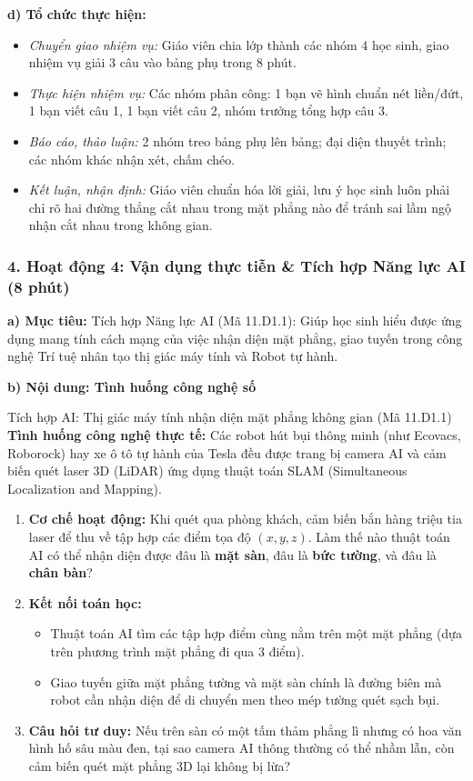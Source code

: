 \documentclass[12pt, a4paper]{article}
\begin{document}
\noindent \textbf{d) Tổ chức thực hiện:}
\begin{itemize}[leftmargin=0.8cm]
    \item \textit{Chuyển giao nhiệm vụ:} Giáo viên chia lớp thành các nhóm 4 học sinh, giao nhiệm vụ giải 3 câu vào bảng phụ trong 8 phút.
    \item \textit{Thực hiện nhiệm vụ:} Các nhóm phân công: 1 bạn vẽ hình chuẩn nét liền/đứt, 1 bạn viết câu 1, 1 bạn viết câu 2, nhóm trưởng tổng hợp câu 3.
    \item \textit{Báo cáo, thảo luận:} 2 nhóm treo bảng phụ lên bảng; đại diện thuyết trình; các nhóm khác nhận xét, chấm chéo.
    \item \textit{Kết luận, nhận định:} Giáo viên chuẩn hóa lời giải, lưu ý học sinh luôn phải chỉ rõ hai đường thẳng cắt nhau trong mặt phẳng nào để tránh sai lầm ngộ nhận cắt nhau trong không gian.
\end{itemize}

\subsubsection*{4. Hoạt động 4: Vận dụng thực tiễn \& Tích hợp Năng lực AI (8 phút)}

\noindent \textbf{a) Mục tiêu:}
Tích hợp Năng lực AI (Mã 11.D1.1): Giúp học sinh hiểu được ứng dụng mang tính cách mạng của việc nhận diện mặt phẳng, giao tuyến trong công nghệ Trí tuệ nhân tạo thị giác máy tính và Robot tự hành.

\noindent \textbf{b) Nội dung: Tình huống công nghệ số}
\begin{aibox}{Tích hợp AI: Thị giác máy tính nhận diện mặt phẳng không gian (Mã 11.D1.1)}
\textbf{Tình huống công nghệ thực tế:}
Các robot hút bụi thông minh (như Ecovacs, Roborock) hay xe ô tô tự hành của Tesla đều được trang bị camera AI và cảm biến quét laser 3D (LiDAR) ứng dụng thuật toán SLAM (Simultaneous Localization and Mapping).
\begin{enumerate}[leftmargin=0.6cm]
    \item \textbf{Cơ chế hoạt động:} Khi quét qua phòng khách, cảm biến bắn hàng triệu tia laser để thu về tập hợp các điểm tọa độ $(x, y, z)$. Làm thế nào thuật toán AI có thể nhận diện được đâu là \textbf{mặt sàn}, đâu là \textbf{bức tường}, và đâu là \textbf{chân bàn}?
    \item \textbf{Kết nối toán học:}
    \begin{itemize}
        \item Thuật toán AI tìm các tập hợp điểm cùng nằm trên một mặt phẳng (dựa trên phương trình mặt phẳng đi qua 3 điểm).
        \item Giao tuyến giữa mặt phẳng tường và mặt sàn chính là đường biên mà robot cần nhận diện để di chuyển men theo mép tường quét sạch bụi.
    \end{itemize}
    \item \textbf{Câu hỏi tư duy:} Nếu trên sàn có một tấm thảm phẳng lì nhưng có hoa văn hình hố sâu màu đen, tại sao camera AI thông thường có thể nhầm lẫn, còn cảm biến quét mặt phẳng 3D lại không bị lừa?
\end{enumerate}
\end{aibox}
\end{document}
